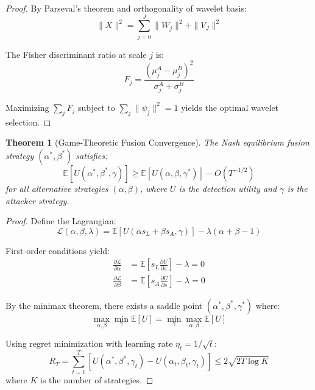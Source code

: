 \documentclass[10pt,conference]{IEEEtran}
\newtheorem{theorem}{Theorem}
\begin{document}
\begin{proof}
By Parseval's theorem and orthogonality of wavelet basis:
\begin{equation}
\|X\|^2 = \sum_{j=0}^{J} \|W_j\|^2 + \|V_J\|^2
\end{equation}

The Fisher discriminant ratio at scale $j$ is:
\begin{equation}
F_j = \frac{(\mu_j^A - \mu_j^B)^2}{\sigma_j^A + \sigma_j^B}
\end{equation}

Maximizing $\sum_j F_j$ subject to $\sum_j \|\psi_j\|^2 = 1$ yields the optimal wavelet selection.
\end{proof}

\begin{theorem}[Game-Theoretic Fusion Convergence]
\label{thm:game_convergence}
The Nash equilibrium fusion strategy $(\alpha^*, \beta^*)$ satisfies:
\begin{equation}
\mathbb{E}[U(\alpha^*, \beta^*, \gamma)] \geq \mathbb{E}[U(\alpha, \beta, \gamma^*)] - O(T^{-1/2})
\end{equation}
for all alternative strategies $(\alpha, \beta)$, where $U$ is the detection utility and $\gamma$ is the attacker strategy.
\end{theorem}

\begin{proof}
Define the Lagrangian:
\begin{equation}
\mathcal{L}(\alpha, \beta, \lambda) = \mathbb{E}[U(\alpha s_L + \beta s_A, \gamma)] - \lambda(\alpha + \beta - 1)
\end{equation}

First-order conditions yield:
\begin{align}
\frac{\partial \mathcal{L}}{\partial \alpha} &= \mathbb{E}[s_L \frac{\partial U}{\partial s}] - \lambda = 0\\
\frac{\partial \mathcal{L}}{\partial \beta} &= \mathbb{E}[s_A \frac{\partial U}{\partial s}] - \lambda = 0
\end{align}

By the minimax theorem, there exists a saddle point $(\alpha^*, \beta^*, \gamma^*)$ where:
\begin{equation}
\max_{\alpha,\beta} \min_{\gamma} \mathbb{E}[U] = \min_{\gamma} \max_{\alpha,\beta} \mathbb{E}[U]
\end{equation}

Using regret minimization with learning rate $\eta_t = 1/\sqrt{t}$:
\begin{equation}
R_T = \sum_{t=1}^{T} [U(\alpha^*, \beta^*, \gamma_t) - U(\alpha_t, \beta_t, \gamma_t)] \leq 2\sqrt{2T \log K}
\end{equation}
where $K$ is the number of strategies.
\end{proof}
\end{document}
